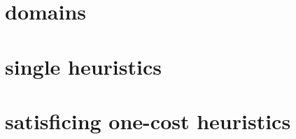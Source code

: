 \section{domains}
\label{sec:orgheadline1}

\section{single heuristics}
\label{sec:orgheadline2}

\section{satisficing one-cost heuristics}
\label{sec:orgheadline3}
